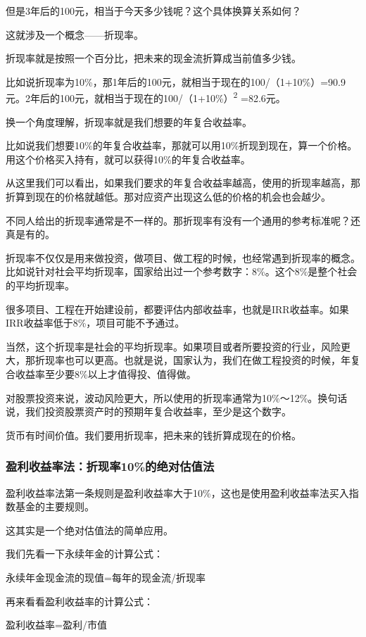 但是3年后的100元，相当于今天多少钱呢？这个具体换算关系如何？

这就涉及一个概念——折现率。

折现率就是按照一个百分比，把未来的现金流折算成当前值多少钱。

比如说折现率为10\%，那1年后的100元，就相当于现在的100/（1+10\%）=90.9元。2年后的100元，就相当于现在的100/（1+10\%）\textsuperscript{2} =82.6元。

换一个角度理解，折现率就是我们想要的年复合收益率。

比如说我们想要10\%的年复合收益率，那就可以用10\%折现到现在，算一个价格。用这个价格买入持有，就可以获得10\%的年复合收益率。

从这里我们可以看出，如果我们要求的年复合收益率越高，使用的折现率越高，那折算到现在的价格就越低。那对应资产出现这么低的价格的机会也会越少。

不同人给出的折现率通常是不一样的。那折现率有没有一个通用的参考标准呢？还真是有的。

折现率不仅仅是用来做投资，做项目、做工程的时候，也经常遇到折现率的概念。比如说针对社会平均折现率，国家给出过一个参考数字：8\%。这个8\%是整个社会的平均折现率。

很多项目、工程在开始建设前，都要评估内部收益率，也就是IRR收益率。如果IRR收益率低于8\%，项目可能不予通过。

当然，这个折现率是社会的平均折现率。如果项目或者所要投资的行业，风险更大，那折现率也可以更高。也就是说，国家认为，我们在做工程投资的时候，年复合收益率至少要8\%以上才值得投、值得做。

对股票投资来说，波动风险更大，所以使用的折现率通常为10\%～12\%。换句话说，我们投资股票资产时的预期年复合收益率，至少是这个数字。

货币有时间价值。我们要用折现率，把未来的钱折算成现在的价格。

\subsubsection{盈利收益率法：折现率10\%的绝对估值法}

盈利收益率法第一条规则是盈利收益率大于10\%，这也是使用盈利收益率法买入指数基金的主要规则。

这其实是一个绝对估值法的简单应用。

我们先看一下永续年金的计算公式：

{\kaishu 永续年金现金流的现值=每年的现金流/折现率}

再来看看盈利收益率的计算公式：

{\kaishu 盈利收益率=盈利/市值}

